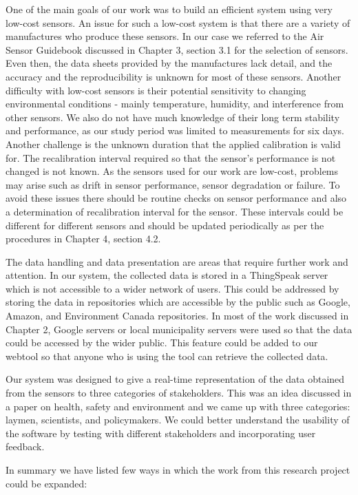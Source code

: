 One of the main goals of our work was to build an efficient system using very low-cost sensors. An issue for such a low-cost system is that there are a variety of manufactures who produce these sensors. In our case we referred to the Air Sensor Guidebook discussed in Chapter 3, section 3.1 for the selection of sensors. Even then, the data sheets provided by the manufactures lack detail, and the accuracy and the reproducibility is unknown for most of these sensors. Another difficulty with low-cost sensors is their potential sensitivity to changing environmental conditions - mainly temperature, humidity, and interference from other sensors. We also do not have much knowledge of their long term stability and performance, as our study period was limited to measurements for six days. Another challenge is the unknown duration that the applied calibration is valid for. The recalibration interval required so that the sensor's performance is not changed is not known. As the sensors used for our work are low-cost, problems may arise such as drift in sensor performance, sensor degradation or failure. To avoid these issues there should be routine checks on sensor performance and also a determination of recalibration interval for the sensor. These intervals could be different for different sensors and should be updated periodically as per the procedures in Chapter 4, section 4.2. 


The data handling and data presentation are areas that require further work and attention. In our system, the collected data is stored in a ThingSpeak server which is not accessible to a wider network of users. This could be addressed by storing the data in repositories which are accessible by the public such as Google, Amazon, and Environment Canada repositories. In most of the work discussed in Chapter 2, Google servers or local municipality servers were used so that the data could be accessed by the wider public. This feature could be added to our webtool so that anyone who is using the tool can retrieve the collected data. 

Our system was designed to give a real-time representation of the data obtained from the sensors to three categories of stakeholders. This was an idea discussed in a paper on health, safety and environment  \cite{English2000} and we came up with three categories: laymen, scientists, and policymakers. We could better understand the usability of the software by testing  with different stakeholders and incorporating user feedback. 

In summary we have listed few ways in which the work from this research project could be expanded: 


